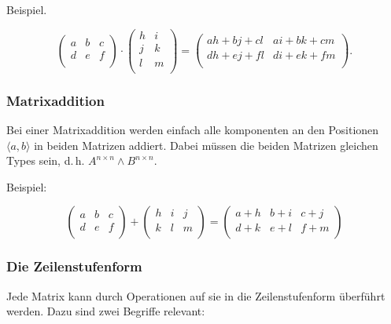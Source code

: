 \documentclass{scrartcl}
\begin{document}
Beispiel.

\begin{equation}
	\begin{pmatrix*}
		a & b & c\\
		d & e & f\\
	\end{pmatrix*} \cdot \begin{pmatrix*}
		h & i\\
		j & k\\
		l & m\\
	\end{pmatrix*} = \begin{pmatrix*}
		ah+bj+cl & ai+bk+cm\\
		dh+ej+fl & di+ek+fm\\
	\end{pmatrix*}.
\end{equation}

\subsubsection{Matrixaddition}

Bei einer Matrixaddition werden einfach alle komponenten an den Positionen $\langle a, b\rangle$ in beiden Matrizen addiert.
Dabei müssen die beiden Matrizen gleichen Types sein, d.\,h. $A^{n\times n} \wedge B^{n\times n}$.

Beispiel:

\begin{equation}
	\begin{pmatrix*}
		a & b & c\\
		d & e & f\\
	\end{pmatrix*} + \begin{pmatrix*}
		h & i & j\\
		k & l & m\\
	\end{pmatrix*} = \begin{pmatrix*}
		a+h & b+i & c+j\\
		d+k & e+l & f+m\\
	\end{pmatrix*}
\end{equation}

\subsubsection{Die Zeilenstufenform}

\label{zeilenstufenform}
Jede Matrix kann durch Operationen auf sie in die Zeilenstufenform überführt werden. Dazu sind zwei
Begriffe relevant:
\end{document}
